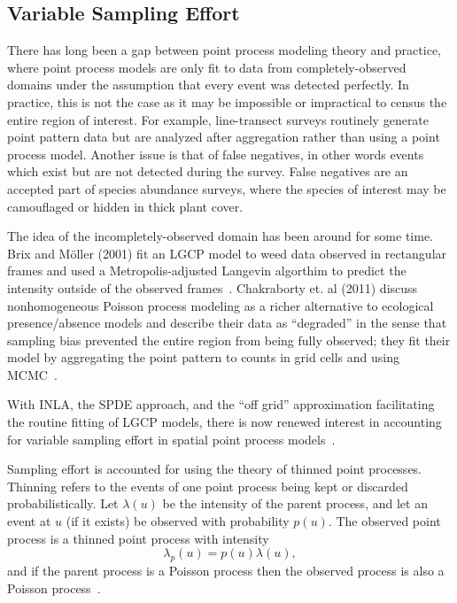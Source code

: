 \documentclass[]{interact}
\begin{document}


\subsection{Variable Sampling Effort}

There has long been a gap between point process modeling theory and practice,
where point process models are only fit to data from completely-observed
domains under the assumption that every event was detected perfectly. In
practice, this is not the case as it may be impossible or impractical to census
the entire region of interest. For example, line-transect surveys routinely
generate point pattern data but are analyzed after aggregation rather than
using a point process model. Another issue is that of false negatives, in other
words events which exist but are not detected during the survey. False
negatives are an accepted part of species abundance surveys, where the species
of interest may be camouflaged or hidden in thick plant cover.

The idea of the incompletely-observed domain has been around for some time.
Brix and M\"{o}ller (2001) fit an LGCP model to weed data observed in
rectangular frames and used a Metropolis-adjusted Langevin algorthim
to predict the intensity outside of the observed frames~\cite{brixmoeller}.
Chakraborty et. al (2011) discuss nonhomogeneous Poisson process modeling as
a richer alternative to ecological presence/absence models and describe their
data as ``degraded'' in the sense that sampling bias prevented the entire
region from being fully observed; they fit their model by aggregating the
point pattern to counts in grid cells and using MCMC~\cite{chakrabortyetal}.

With INLA, the SPDE approach, and the ``off grid'' approximation
facilitating the routine fitting of LGCP models, there is now renewed interest
in accounting for variable sampling effort in spatial point process
models~\cite{simpsonetal,yuanetal}.

Sampling effort is accounted for using the theory of thinned point processes.
Thinning refers to the events of one point process being kept or discarded
probabilistically. Let \(\lambda(u)\) be the intensity of the parent process,
and let an event at \(u\) (if it exists) be observed with probability
\(p(u)\). The observed point process is a thinned point process with
intensity
\begin{displaymath}
\lambda_{p}(u) = p(u) \lambda(u),
\end{displaymath}
and if the parent process is a Poisson process then the observed process is
also a Poisson process~\cite{moellerwaagepetersen}.
\end{document}
